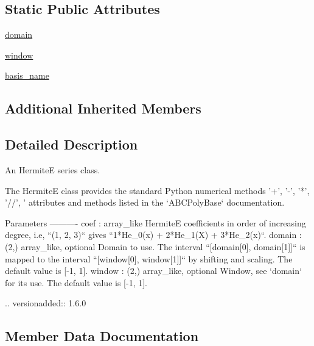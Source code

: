 \subsection*{Static Public Attributes}
\begin{DoxyCompactItemize}
\item 
\hyperlink{classnumpy_1_1polynomial_1_1hermite__e_1_1HermiteE_a37d965f1fe0cb0731be09c3a753f5a17}{domain}
\item 
\hyperlink{classnumpy_1_1polynomial_1_1hermite__e_1_1HermiteE_a716e0c00970ec92d6795fcc587a163f1}{window}
\item 
\hyperlink{classnumpy_1_1polynomial_1_1hermite__e_1_1HermiteE_a7bcd1a5fa1ada93e3b5531b8b0f6dffa}{basis\+\_\+name}
\end{DoxyCompactItemize}
\subsection*{Additional Inherited Members}


\subsection{Detailed Description}
\begin{DoxyVerb}An HermiteE series class.

The HermiteE class provides the standard Python numerical methods
'+', '-', '*', '//', '%
attributes and methods listed in the `ABCPolyBase` documentation.

Parameters
----------
coef : array_like
    HermiteE coefficients in order of increasing degree, i.e,
    ``(1, 2, 3)`` gives ``1*He_0(x) + 2*He_1(X) + 3*He_2(x)``.
domain : (2,) array_like, optional
    Domain to use. The interval ``[domain[0], domain[1]]`` is mapped
    to the interval ``[window[0], window[1]]`` by shifting and scaling.
    The default value is [-1, 1].
window : (2,) array_like, optional
    Window, see `domain` for its use. The default value is [-1, 1].

    .. versionadded:: 1.6.0\end{DoxyVerb}
 

\subsection{Member Data Documentation}
\mbox{\label{classnumpy_1_1polynomial_1_1hermite__e_1_1HermiteE_a7bcd1a5fa1ada93e3b5531b8b0f6dffa}} 
